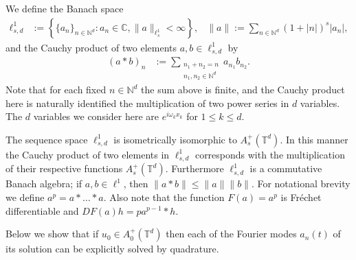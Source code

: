 \documentclass{article}
\newcommand{\C}{\mathbb{C}}
\newcommand{\N}{\mathbb{N}}
\newcommand{\T}{\mathbb{T}}
\begin{document}
We define the Banach space 
\begin{align*}
\ell^1_{s,d} &:= \left\{ \{ a_n \}_{n\in\N^d}: a_n \in \C,  \|a\|_{\ell^1_s} < \infty   \right\} ,&
\|a\| := \sum_{n\in \N^d} 	(1+|n|)^s
|a_n |,
\end{align*}
 and   the Cauchy product  of two elements $ a , b \in \ell^1_{s,d}$ by 
\begin{align*}
(a * b)_n &:= \sum_{\substack{n_1 + n_2 = n  \\ n_1,n_2 \in \N^d}} a_{n_1} b_{n_2} .
\end{align*}
Note that for each fixed $ n \in \N^d$ the sum above is finite, and the Cauchy product here is naturally identified the multiplication of two power series in $d$ variables.
The $d$ variables we consider here are $ e^{i \omega_k  x_k}$ for $ 1 \leq k \leq d$.  



The sequence space $ \ell^1_{s,d}$ is isometrically isomorphic to $ A_s^+(\T^d)$. 
In this manner the Cauchy product of two elements in  $ \ell^1_{s,d}$ corresponds with the multiplication of their respective functions $ A_s^+(\T^d)$.  
Furthermore $\ell^1_{s,d}$ is a commutative Banach algebra;  if $a,b\in \ell^1$, then $ \| a * b\| \leq \| a\| \| b\|$. 
For notational brevity  we define $ a^p = a * \dots *a$. 	
Also note that the function $F(a) = a^p$ is Fr\'echet differentiable and $ DF(a)h = p a^{p-1} * h$. 


Below we show that if $ u_0 \in A^+_0(\T^d)$ then  each of the Fourier modes $a_n(t)$ of its solution can be explicitly solved  by quadrature. 
\end{document}
